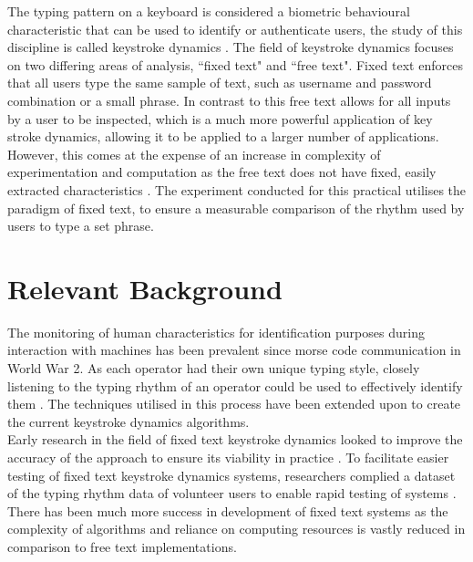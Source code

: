 \documentclass{article}
\begin{document}
The typing pattern on a keyboard is considered a biometric behavioural characteristic that can be used to identify or authenticate users, the study of this discipline is called keystroke dynamics \parencite{keyStrokeDynamics}. The field of keystroke dynamics focuses on two differing areas of analysis, ``fixed text" and ``free text". Fixed text enforces that all users type the same sample of text, such as username and password combination or a small phrase. In contrast to this free text allows for all inputs by a user to be inspected, which is a much more powerful application of key stroke dynamics, allowing it to be applied to a larger number of applications. However, this comes at the expense of an increase in complexity of experimentation and computation as the free text does not have fixed, easily extracted characteristics \parencite{sznur2015advances}. The experiment conducted for this practical utilises the paradigm of fixed text, to ensure a measurable comparison of the rhythm used by users to type a set phrase. 

\section{Relevant Background} \label{background}
The monitoring of human characteristics for identification purposes during interaction with machines has been prevalent since morse code communication in World War 2. As each operator had their own unique typing style, closely listening to the typing rhythm of an operator could be used to effectively identify them \parencite{sznur2015advances}. The techniques utilised in this process have been extended upon to create the current keystroke dynamics algorithms. \\

Early research in the field of fixed text keystroke dynamics looked to improve the accuracy of the approach to ensure its viability in practice \parencite{Bergadano:2002}. To facilitate easier testing of fixed text keystroke dynamics systems, researchers complied a dataset of the typing rhythm data
of volunteer users to enable rapid testing of systems \parencite{bello2010collection}. There has been much more success in development of fixed text systems as the complexity of algorithms and reliance on computing resources is vastly reduced in comparison to free text implementations. \\
\end{document}
